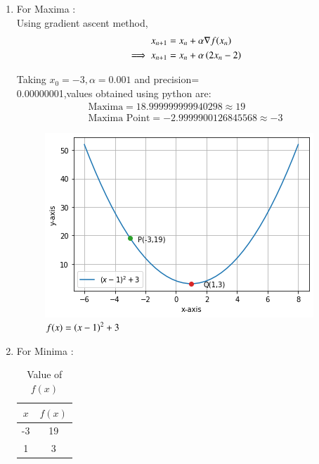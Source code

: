 \begin{enumerate}
    \item For Maxima : \\
    Using gradient ascent method,
    \begin{align}
        x_{n+1} &= x_n + \alpha \nabla f(x_n) \\
        \implies x_{n+1} &= x_n + \alpha \left(2x_n-2\right)
    \end{align}
    
    Taking $x_0=-3,\alpha=0.001$ and precision= \\ 0.00000001,values obtained using python are:
    \begin{align}
        \boxed{\text{Maxima} = 18.999999999940298 \approx 19 }\\
        \boxed{\text{Maxima Point} = -2.9999900126845568 \approx -3}
    \end{align}
    
    
    \begin{figure}[!ht]
    \centering
    \includegraphics[width=\columnwidth]{solutions/su2021/2/1/b/Figure/Figure.png}
    \caption{$f(x)=\left(x-1\right)^2+3$}
    \label{opt/2/1/b/f(x)}	
    \end{figure}
    \item For Minima : \\
    
    \begin{table}[!ht]
    \centering
    \begin{tabular}{|c|c|} 
    \hline
    $x$ & $f(x)$ \\
    \hline
    -3& 19 \\
    \hline
   1 & 3 \\
    \hline
    \end{tabular}
    \caption{Value of $f(x)$}
    \label{opt/2/1/b/tab:table1}
    \end{table}
    

\end{enumerate}
